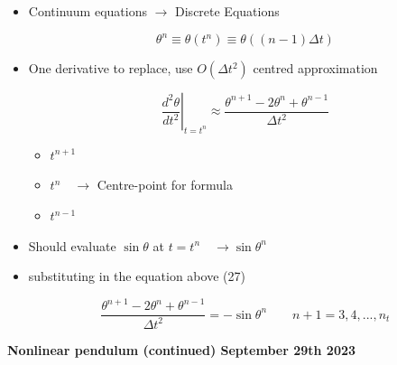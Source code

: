 \begin{itemize}
    \item Continuum equations $\rightarrow$ Discrete Equations

    \[ \theta^n \equiv \theta (t^n) \equiv \theta ((n-1)\Delta t)\]
    

    \item One derivative to replace, use $O(\Delta t^2)$ centred approximation

    \begin{equation}
        \left. \frac{d^2 \theta}{dt^2} \right|_{t=t^n} \approx \frac{\theta^{n+1}-2\theta^n + \theta^{n-1}}{\Delta t^2}
    \end{equation}

    \begin{itemize}
        \item $t^{n+1}$
        \item $t^n \quad \rightarrow$ Centre-point for formula
        \item $t^{n-1}$
    \end{itemize}

    \item Should evaluate $\sin\theta$ at $t = t^n \quad \rightarrow \sin \theta^n$

    \item substituting in the equation above (27)

    \begin{equation}
        \frac{\theta^{n+1}-2\theta^n + \theta^{n-1}}{\Delta t^2} = -\sin\theta^n \qquad n+1 = 3,4,...,n_t
    \end{equation}
\end{itemize}


\textbf{Nonlinear pendulum (continued) September 29th 2023}

